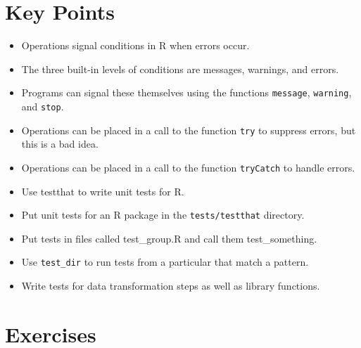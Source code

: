 \section{Key Points}

\begin{itemize}
\item
  Operations signal conditions in R when errors occur.
\item
  The three built-in levels of conditions are messages, warnings, and errors.
\item
  Programs can signal these themselves using the functions \texttt{message}, \texttt{warning}, and \texttt{stop}.
\item
  Operations can be placed in a call to the function \texttt{try} to suppress errors, but this is a bad idea.
\item
  Operations can be placed in a call to the function \texttt{tryCatch} to handle errors.
\item
  Use testthat to write unit tests for R.
\item
  Put unit tests for an R package in the \texttt{tests/testthat} directory.
\item
  Put tests in files called test\_group.R and call them test\_something.
\item
  Use \texttt{test\_dir} to run tests from a particular that match a pattern.
\item
  Write tests for data transformation steps as well as library functions.
\end{itemize}

\section{Exercises}


